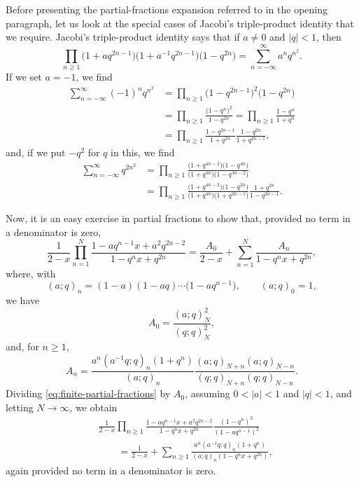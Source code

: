 \documentclass[10pt]{article}
\begin{document}
Before presenting the partial-fractions expansion referred to in the opening
paragraph, let us look at the special cases of Jacobi's triple-product identity
that we require. Jacobi's triple-product identity says that if $a\neq 0$ and
$|q|<1$, then
\[
\prod_{n\geq 1}
 \bigl(1+aq^{2n-1}\bigr)
 \bigl(1+a^{-1}q^{2n-1}\bigr)
 \bigl(1-q^{2n}\bigr)
 =\sum_{n=-\infty}^{\infty}a^nq^{n^2}.
\]
If we set $a=-1$, we find
\[
\begin{aligned}
\sum_{n=-\infty}^{\infty}(-1)^nq^{n^2}
 &=\prod_{n\geq 1}\bigl(1-q^{2n-1}\bigr)^2\bigl(1-q^{2n}\bigr) \\
 &=\prod_{n\geq 1}\frac{\bigl(1-q^n\bigr)^2}{1-q^{2n}}
  =\prod_{n\geq 1}\frac{1-q^n}{1+q^n} \\
 &=\prod_{n\geq 1}
   \frac{1-q^{2n-1}}{1+q^{2n}}
   \frac{1-q^{2n}}{1+q^{2n-1}},
\end{aligned}
\]
and, if we put $-q^2$ for $q$ in this, we find
\[
\begin{aligned}
\sum_{n=-\infty}^{\infty}q^{2n^2}
 &=\prod_{n\geq 1}
   \frac{\bigl(1+q^{4n-2}\bigr)\bigl(1-q^{4n}\bigr)}
        {\bigl(1+q^{4n}\bigr)\bigl(1-q^{4n-2}\bigr)} \\
 &=\prod_{n\geq 1}
   \frac{\bigl(1+q^{4n-2}\bigr)\bigl(1-q^{2n}\bigr)}
        {\bigl(1+q^{4n}\bigr)\bigl(1+q^{2n-1}\bigr)}
   \frac{1+q^{2n}}{1-q^{2n-1}}.
\end{aligned}
\]

Now, it is an easy exercise in partial fractions to show that, provided no term
in a denominator is zero,
\begin{equation}
\frac{1}{2-x}\prod_{n=1}^{N}
 \frac{1-aq^{n-1}x+a^2q^{2n-2}}{1-q^nx+q^{2n}}
 =\frac{A_0}{2-x}
  +\sum_{n=1}^{N}\frac{A_n}{1-q^nx+q^{2n}},
\label{eq:finite-partial-fractions}
\end{equation}
where, with
\[
(a;q)_n=(1-a)(1-aq)\cdots\bigl(1-aq^{n-1}\bigr),
\qquad (a;q)_0=1,
\]
we have
\[
A_0=\frac{(a;q)_N^2}{(q;q)_N^2},
\]
and, for $n\geq 1$,
\[
A_n=
\frac{a^n(a^{-1}q;q)_n(1+q^n)}{(a;q)_n}
\frac{(a;q)_{N+n}(a;q)_{N-n}}
     {(q;q)_{N+n}(q;q)_{N-n}}.
\]
Dividing \eqref{eq:finite-partial-fractions} by $A_0$, assuming
$0<|a|<1$ and $|q|<1$, and letting $N\to\infty$, we obtain
\begin{equation}
\begin{aligned}
&\frac{1}{2-x}\prod_{n\geq 1}
 \frac{1-aq^{n-1}x+a^2q^{2n-2}}{1-q^nx+q^{2n}}
 \frac{(1-q^n)^2}{(1-aq^{n-1})^2} \\
&\qquad=\frac{1}{2-x}
 +\sum_{n\geq 1}
  \frac{a^n(a^{-1}q;q)_n(1+q^n)}
       {(a;q)_n(1-q^nx+q^{2n})},
\end{aligned}
\label{eq:infinite-partial-fractions}
\end{equation}
again provided no term in a denominator is zero.
\end{document}
